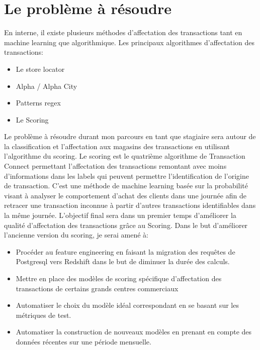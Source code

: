 \section{Le problème à résoudre} 
En interne, il existe plusieurs méthodes d’affectation des transactions tant en machine learning que algorithmique. 
Les principaux algorithmes d’affectation des transactions:
\begin{itemize}
\item Le store locator
\item Alpha / Alpha City
\item Patterns regex
\item Le Scoring
\end{itemize}
Le problème à résoudre durant mon parcours en tant que stagiaire sera autour de la classification et l'affectation aux magasins des transactions en utilisant l’algorithme du scoring. Le scoring est le quatrième algorithme de Transaction Connect permettant l’affectation des transactions remontant avec moins d’informations dans les labels qui peuvent permettre l’identification de l’origine de transaction. C’est une méthode de machine learning basée sur la probabilité visant à analyser le comportement d’achat des clients dans une journée afin de retracer une transaction inconnue à partir d’autres transactions identifiables dans la même journée.
L’objectif final sera dans un premier temps d'améliorer la qualité d’affectation des transactions grâce au Scoring. 
Dans le but d’améliorer l’ancienne version du scoring, je serai amené à:
\begin{itemize}
\item Procéder au feature engineering en faisant la migration des requêtes de Postgresql vers Redshift dans le but de diminuer la durée des calculs.
\item Mettre en place des modèles de scoring spécifique d’affectation des transactions de certains grands centres commerciaux
\item Automatiser le choix du modèle idéal correspondant en se basant sur les métriques de test.
\item Automatiser la construction de nouveaux modèles en prenant en compte des données récentes sur une période mensuelle.
\end{itemize}

